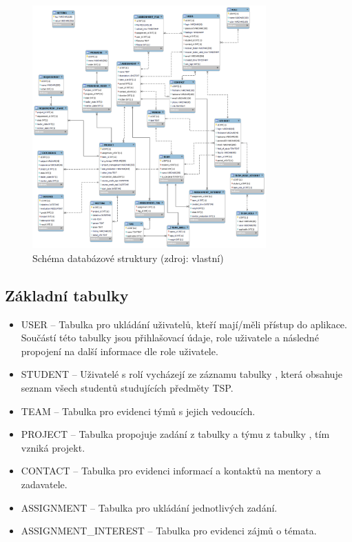 \documentclass[czech,BP]{thesiskiv}
\begin{document}
		\begin{figure}[H]
			\centering
			\includegraphics[width=0.8\textwidth]{img/database/database_model}
			\caption{Schéma databázové struktury (zdroj: vlastní)}
			\label{fig:strukturaDB}
		\end{figure}
		\subsection{Základní tabulky}
			\begin{itemize}
				\item USER -- Tabulka pro ukládání uživatelů, kteří mají/měli přístup do aplikace. Součástí této tabulky jsou přihlašovací údaje, role uživatele a následné propojení na další informace dle role uživatele.
				\item STUDENT -- Uživatelé s rolí  vycházejí ze záznamu tabulky , která obsahuje seznam všech studentů studujících předměty TSP.
				\item TEAM -- Tabulka pro evidenci týmů s jejich vedoucích.
				\item PROJECT -- Tabulka propojuje zadání z tabulky  a týmu z tabulky , tím vzniká projekt.
				\item CONTACT -- Tabulka pro evidenci informací a kontaktů na mentory a zadavatele.
				\item ASSIGNMENT -- Tabulka pro ukládání jednotlivých zadání.
				\item ASSIGNMENT\_INTEREST -- Tabulka pro evidenci zájmů o témata.
			\end{itemize}
\end{document}
